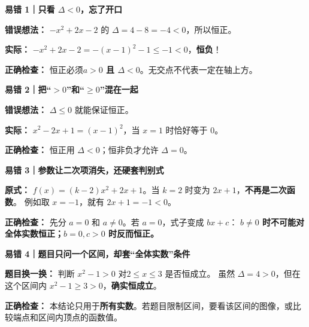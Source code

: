 \begin{trapbox}
  \textbf{\textcolor{CTrap}{易错 1｜只看 $\Delta<0$，忘了开口}}

  \textbf{错误想法：} $-x^2+2x-2$ 的 $\Delta=4-8=-4<0$，所以恒正。

  \textbf{实际：} $-x^2+2x-2=-(x-1)^2-1\le-1<0$，\textbf{恒负}！
  \begin{center}
  
  \end{center}
  \textbf{正确检查：} 恒正必须\textbf{$a>0$ 且 $\Delta<0$}。无交点不代表一定在轴上方。

  \medskip
  \textbf{\textcolor{CTrap}{易错 2｜把“$>0$”和“$\ge0$”混在一起}}

  \textbf{错误想法：} $\Delta\le0$ 就能保证恒正。

  \textbf{实际：} $x^2-2x+1=(x-1)^2$，当 $x=1$ 时恰好等于 $0$。
  \begin{center}
  
  \end{center}
  \textbf{正确检查：} 恒正用 $\Delta<0$；恒非负才允许 $\Delta=0$。

  \medskip
  \textbf{\textcolor{CTrap}{易错 3｜参数让二次项消失，还硬套判别式}}

  \textbf{原式：} $f(x)=(k-2)x^2+2x+1$。当 $k=2$ 时变为 $2x+1$，\textbf{不再是二次函数}。
  例如取 $x=-1$，就有 $2x+1=-1<0$。
  \begin{center}
  
  \end{center}
  \textbf{正确检查：} 先分 $a=0$ 和 $a\ne0$。若 $a=0$，式子变成 $bx+c$：
  \textbf{$b\ne0$ 时不可能对全体实数恒正；$b=0,c>0$ 时反而恒正。}

  \medskip
  \textbf{\textcolor{CTrap}{易错 4｜题目只问一个区间，却套“全体实数”条件}}

  \textbf{题目换一换：} 判断 $x^2-1>0$ 对\textbf{$2\le x\le3$} 是否恒成立。
  虽然 $\Delta=4>0$，但在这个区间内 $x^2-1\ge3>0$，\textbf{确实恒成立}。
  \begin{center}
  
  \end{center}
  \textbf{正确检查：} 本结论只用于\textbf{所有实数}。若题目限制区间，要看该区间的图像，或比较端点和区间内顶点的函数值。
\end{trapbox}
